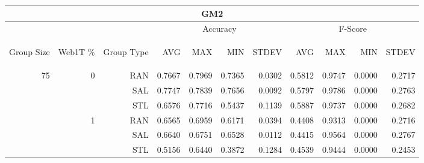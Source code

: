 \begin{center}
\begin{table}[htbp]
\begin{tabular}{ | r | r | r | r | r | r | r | r | r | r | r |}
\hline
\multicolumn{11}{|c|}{GM2}\\
\hline
 & & & \multicolumn{4}{|c|}{Accuracy} & \multicolumn{4}{|c|}{F-Score}\\ \cline{4-11}
\begin{sideways}Group Size\end{sideways} & \begin{sideways}Web1T \%\end{sideways} & \begin{sideways}Group Type\end{sideways} & \begin{sideways}AVG\end{sideways} & \begin{sideways}MAX\end{sideways} & \begin{sideways}MIN\end{sideways} & \begin{sideways}STDEV\end{sideways} & \begin{sideways}AVG\end{sideways} & \begin{sideways}MAX\end{sideways} & \begin{sideways}MIN\end{sideways} & \begin{sideways}STDEV\end{sideways}\\
\hline
\multirow{15}{*}{75}
 & \multirow{3}{*}{0} & RAN & 0.7667 & 0.7969 & 0.7365 & 0.0302 & 0.5812 & 0.9747 & 0.0000 & 0.2717\\ \cline{3-11}
 &   & SAL & 0.7747 & 0.7839 & 0.7656 & 0.0092 & 0.5797 & 0.9786 & 0.0000 & 0.2763\\ \cline{3-11}
 &   & STL & 0.6576 & 0.7716 & 0.5437 & 0.1139 & 0.5887 & 0.9737 & 0.0000 & 0.2682\\ \cline{2-11}
 & \multirow{3}{*}{1} & RAN & 0.6565 & 0.6959 & 0.6171 & 0.0394 & 0.4408 & 0.9313 & 0.0000 & 0.2716\\ \cline{3-11}
 &   & SAL & 0.6640 & 0.6751 & 0.6528 & 0.0112 & 0.4415 & 0.9564 & 0.0000 & 0.2767\\ \cline{3-11}
 &   & STL & 0.5156 & 0.6440 & 0.3872 & 0.1284 & 0.4539 & 0.9444 & 0.0000 & 0.2453\\ \cline{2-11}

\end{tabular}
\end{table}
\end{center}
